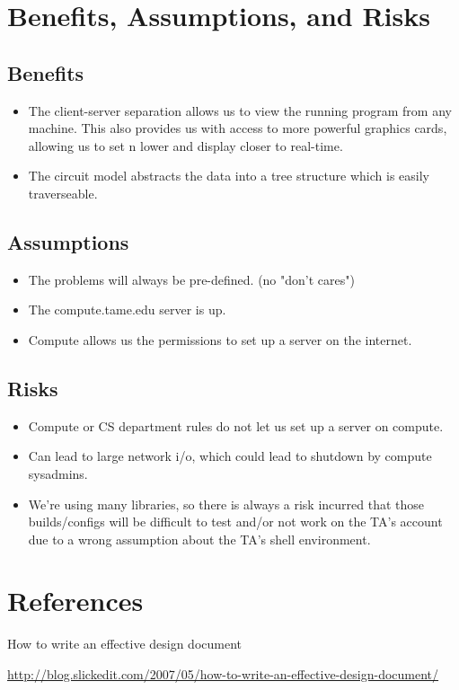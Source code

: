 \documentclass{article}
\begin{document}
\section{Benefits, Assumptions, and Risks}
\label{sec-7}

\subsection{Benefits}
\label{sec-7-1}

\begin{itemize}
\item The client-server separation allows us to view the running program from any
machine. This also provides us with access to more powerful graphics cards,
allowing us to set n lower and display closer to real-time.

\item The circuit model abstracts the data into a tree structure which is easily
traverseable.
\end{itemize}

\subsection{Assumptions}
\label{sec-7-2}

\begin{itemize}
\item The problems will always be pre-defined. (no "don't cares")

\item The compute.tame.edu server is up.

\item Compute allows us the permissions to set up a server on the internet.
\end{itemize}

\subsection{Risks}
\label{sec-7-3}

\begin{itemize}
\item Compute or CS department rules do not let us set up a server on compute.

\item Can lead to large network i/o, which could lead to shutdown by compute sysadmins.

\item We're using many libraries, so there is always a risk incurred that those
builds/configs will be difficult to test and/or not work on the TA's account
due to a wrong assumption about the TA's shell environment.
\end{itemize}

\section{References}
\label{sec-8}
\begin{description}
\item[{How to write an effective design document}] 
\end{description}
\url{http://blog.slickedit.com/2007/05/how-to-write-an-effective-design-document/}
\end{document}
